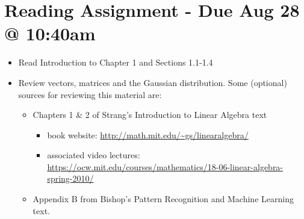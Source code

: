 \documentclass[11pt]{amsart}
\begin{document}
\section{Reading Assignment - Due Aug 28 @ 10:40am}
\begin{itemize}
\item Read Introduction to Chapter 1 and Sections 1.1-1.4
\item Review vectors, matrices and the Gaussian distribution. Some (optional) sources for reviewing this material are:
\begin{itemize} 
\item Chapters 1 \& 2 of Strang's Introduction to Linear Algebra text 
\begin{itemize}
	\item book website: \url{http://math.mit.edu/~gs/linearalgebra/}
	\item associated video lectures: \\\url{https://ocw.mit.edu/courses/mathematics/18-06-linear-algebra-spring-2010/} \end{itemize}
\item Appendix B from Bishop's Pattern Recognition and Machine Learning text.  
\end{itemize}
\end{itemize}
\end{document}
